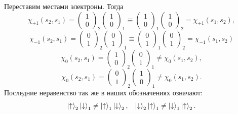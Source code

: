 Переставим местами электроны. Тогда
\begin{equation*}
	\chi_{+1} (s_2, s_1) = \begin{pmatrix}1 \\ 0\end{pmatrix}_2 \begin{pmatrix}1 \\ 0\end{pmatrix}_1 \equiv \begin{pmatrix}1 \\ 0\end{pmatrix}_1 \begin{pmatrix}1 \\ 0\end{pmatrix}_2
	=
	\chi_{+1}(s_1, s_2),
\end{equation*}
\begin{equation*}
	\chi_{-1} (s_2, s_1) = \begin{pmatrix}0 \\ 1\end{pmatrix}_2 \begin{pmatrix}0 \\ 1\end{pmatrix}_1 \equiv \begin{pmatrix}0 \\ 1\end{pmatrix}_1 \begin{pmatrix}0 \\ 1\end{pmatrix}_2
	=
	\chi_{-1}(s_1, s_2)
\end{equation*}
\begin{equation*}
	\chi_0(s_2, s_1) = \begin{pmatrix}1 \\ 0\end{pmatrix}_2 \begin{pmatrix}0 \\ 1\end{pmatrix}_1
	\neq \chi_0(s_1, s_2),
\end{equation*}
\begin{equation*}
	\chi_0(s_2, s_1) = \begin{pmatrix}0 \\ 1\end{pmatrix}_2 \begin{pmatrix}1 \\ 0\end{pmatrix}_1
	\neq \chi_0(s_1, s_2).
\end{equation*}
Последние неравенство так же в наших обозначениях означают:
\begin{equation*}
	\left|\uparrow\right\rangle_2 \left|\downarrow\right\rangle_1 \neq \left|\uparrow\right\rangle_1 \left|\downarrow\right\rangle_2,
	\hspace{3 mm}
	\left|\downarrow\right\rangle_2 \left|\uparrow\right\rangle_1 \neq \left|\downarrow\right\rangle_1 \left|\uparrow\right\rangle_2.
\end{equation*}

